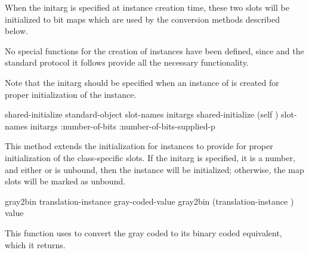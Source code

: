 {\filbreak
{\samepage
{}


When the  initarg is specified at instance creation time,
these two slots will be initialized to bit maps which are used by the conversion methods
described below.
\par}%

\gap\filbreak

{\samepage
{}

No special functions for the creation of  instances have been defined,
since  and the standard  protocol it follows provide all
the necessary functionality.

Note that the  initarg should be specified when an instance of
 is created for proper initialization of the instance.
\par}%

\gap

\filbreak
{\samepage



\Eggeneric shared-initialize {standard-object slot-names \rest initargs}
 shared-initialize {(self ) slot-names \rest initargs
	\key :number-of-bits :number-of-bits-supplied-p}

This method extends the initialization for  instances to provide for
proper initialization of the  class-specific slots.
If the  initarg is specified, it is a number, and either  or
 is unbound, then the instance  will be initialized; otherwise, the map slots
will be marked as unbound.
\par}%

\filbreak

{\samepage

\Defgeneric gray2bin {translation-instance gray-coded-value}
 gray2bin {(translation-instance ) value}

This function uses  to convert the gray coded
 to its binary coded equivalent, which it returns.
\par}%

}
